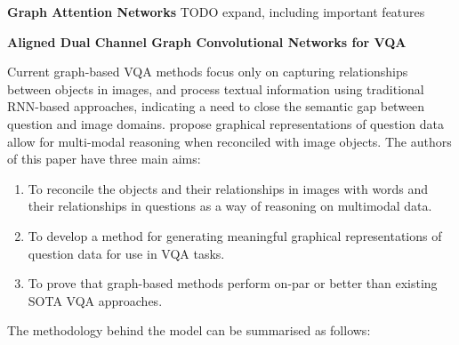 \noindent

\textbf{Graph Attention Networks} \cite{velivckovic2017graph}
\label{velivckovic2017graph}
{\color{red} TODO expand, including important features}

\noindent
\textbf{Aligned Dual Channel Graph Convolutional Networks for VQA} \cite{huang2020aligned}
\label{huang2020aligned}

Current graph-based VQA methods focus only on capturing relationships between objects in images, and process textual information using traditional RNN-based approaches, indicating a need to close the semantic gap between question and image domains. \citeauthor{huang2020aligned} propose graphical representations of question data allow for multi-modal reasoning when reconciled with image objects. The authors of this paper have three main aims:

\begin{enumerate}
    \item To reconcile the objects and their relationships in images with words and their relationships in questions as a way of reasoning on multimodal data.
    \item To develop a method for generating meaningful graphical representations of question data for use in VQA tasks.
    \item To prove that graph-based methods perform on-par or better than existing SOTA VQA approaches.
\end{enumerate}

The methodology behind the model can be summarised as follows:


